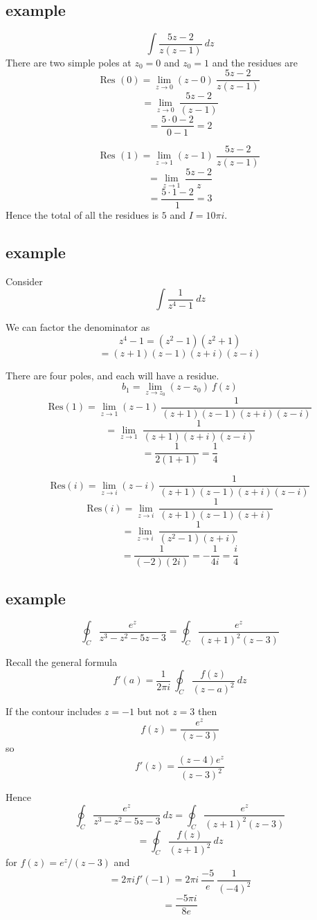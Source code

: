 \documentclass[11pt, oneside]{article}
\begin{document}
\subsection*{example}
\[ \int \frac{5z-2}{z(z-1)} \ dz \]
There are two simple poles at $z_0 = 0$ and $z_0 = 1$ and the residues are
\[ \text{Res }(0) = \lim_{z \rightarrow 0} (z - 0) \ \frac{5z-2}{z(z-1)} \]
\[ = \lim_{z \rightarrow 0} \ \frac{5z-2}{(z-1)} \]
\[ = \frac{5 \cdot 0 - 2}{0 - 1} = 2 \]

\[ \text{Res }(1) = \lim_{z \rightarrow 1} (z - 1) \ \frac{5z-2}{z(z-1)} \]
\[ = \lim_{z \rightarrow 1} \ \frac{5z-2}{z} \]
\[ = \frac{5 \cdot 1 - 2}{1} = 3 \]
Hence the total of all the residues is $5$ and $I = 10 \pi i$.

\subsection*{example}
Consider
\[ \int \frac{1}{z^4 - 1} \ dz \]

We can factor the denominator as
\[ z^4 - 1 = (z^2 - 1)(z^2 + 1) \]
\[ = (z+1)(z-1)(z+i)(z-i) \]

There are four poles, and each will have a residue.
\[ b_1 = \lim_{z \rightarrow z_0} (z-z_0) \ f(z)  \]
\[ \text{Res}(1) =  \lim_{z \rightarrow 1} (z-1) \ \frac{1}{(z+1)(z-1)(z+i)(z-i)} \]
\[ =  \lim_{z \rightarrow 1} \ \frac{1}{(z+1)(z+i)(z-i)} \]
\[ = \frac{1}{2(1+1)} = \frac{1}{4} \]

\[ \text{Res}(i) =  \lim_{z \rightarrow i} (z-i) \ \frac{1}{(z+1)(z-1)(z+i)(z-i)} \]
\[ \text{Res}(i) =  \lim_{z \rightarrow i} \ \frac{1}{(z+1)(z-1)(z+i)} \]
\[ =  \lim_{z \rightarrow i} \ \frac{1}{(z^2 - 1)(z+i)} \]
\[ = \frac{1}{(-2)(2i)} = -\frac{1}{4i} = \frac{i}{4}  \]

\subsection*{example}
\[ \oint_C \frac{e^z}{z^3 - z^2 - 5z - 3} = \oint_C \frac{e^z}{(z+1)^2 (z-3)} \]

Recall the general formula
\[ f'(a) = \frac{1}{2 \pi i} \ \oint_C \frac{f(z)}{(z-a)^2} \ dz \]

If the contour includes $z = -1$ but not $z = 3$ then
\[ f(z) = \frac{e^z}{(z-3)} \]
so
\[ f'(z) = \frac{(z-4)e^z}{(z-3)^2} \]

Hence
\[ \oint_C \frac{e^z}{z^3 - z^2 - 5z - 3} \ dz = \oint_C \frac{e^z}{(z+1)^2 (z-3)} \]
\[ = \oint_C \frac{f(z)}{(z+1)^2} \ dz \]
for $f(z) = e^z/(z-3) $ and
\[ = 2 \pi i f'(-1) = 2 \pi i \ \frac{-5}{e} \ \frac{1}{(-4)^2} \]
\[ = \frac{-5 \pi i}{8 e}  \]
\end{document}

